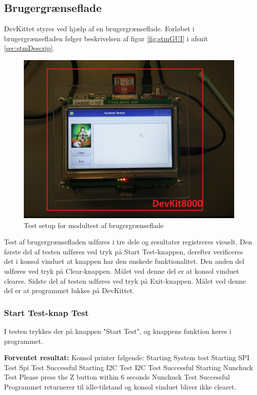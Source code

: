 \subsection{Brugergrænseflade}
DevKittet styres ved hjælp af en brugergrænseflade.
Forløbet i brugergrænsefladen følger beskrivelsen af figur \ref{fig:stmGUI} i afsnit \ref{sec:stmDescrip}.

\begin{figure}[H]
	\centering
	\includegraphics[width=.5\textwidth]{Test/images/GUITest/TestSetup.jpg}
	\caption{Test setup for modultest af brugergrænseflade}
	\label{fig:GUISetup}
\end{figure}

\noindent Test af brugergrænsefladen udføres i tre dele og resultater registreres visuelt. Den første del af testen udføres ved tryk på Start Test-knappen, derefter verificeres det i konsol vinduet at knappen har den ønskede funktionalitet. Den anden del udføres ved tryk på Clear-knappen. Målet ved denne del er at konsol vinduet cleares.
Sidste del af testen udføres ved tryk på Exit-knappen. Målet ved denne del er at programmet lukkes på DevKittet.


\subsubsection{Start Test-knap Test}
I testen trykkes der på knappen "Start Test", og knappens funktion køres i programmet.\newline
 
\noindent\textbf{Forventet resultat:}\newline
\noindent Konsol printer følgende:\newline
Starting System test\newline
Starting SPI Test\newline
Spi Test Successful\newline
Starting I2C Test\newline
I2C Test Successful\newline
Starting Nunchuck Test\newline
Please press the Z button within 6 seconds\newline
Nunchuck Test Successful
\noindent Programmet returnerer til idle-tilstand og konsol vinduet bliver ikke clearet.\newline

